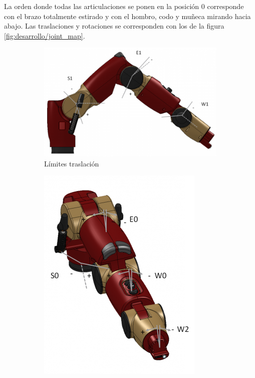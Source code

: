 La orden donde todas las articulaciones se ponen en la posición 0 corresponde con el brazo totalmente estirado y con el hombro, codo y muñeca mirando hacia abajo. Las traslaciones y rotaciones se corresponden con los de la figura \ref{fig:desarrollo/joint_map}.

\begin{figure}[]
	\centering
	\begin{subfigure}[b]{0.4\textwidth}
		\includegraphics[width=\textwidth]{imagenes/metodos/baxter_range_motion1.png}
		\caption{Límites traslación}
		\label{fig:desarrollo/limits1}
	\end{subfigure}
	\begin{subfigure}[b]{0.4\textwidth}
		\includegraphics[width=\textwidth]{imagenes/metodos/baxter_range_motion2.png}

\end{subfigure}
\end{figure}
